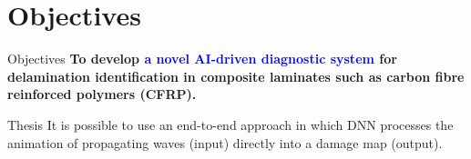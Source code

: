 \documentclass[10pt,aspectratio=169]{beamer} %
\begin{document}
\section{Objectives}
\begin{frame}{Objectives}
		\textbf{To develop \textcolor{blue}{a novel AI-driven diagnostic system} for delamination identification in composite laminates such as carbon fibre reinforced polymers (CFRP).}
		\\
	\begin{alertblock}{Thesis}
		It is possible to use an end-to-end approach in which DNN 
		processes the animation of propagating waves (input) directly into a damage map (output).
	\end{alertblock}
\end{frame}
\end{document}
